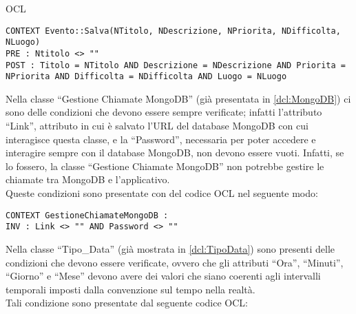 \begin{listaPersonale}{OCL}
    \begin{lstlisting}
CONTEXT Evento::Salva(NTitolo, NDescrizione, NPriorita, NDifficolta, NLuogo)
PRE : Ntitolo <> ""
POST : Titolo = NTitolo AND Descrizione = NDescrizione AND Priorita = NPriorita AND Difficolta = NDifficolta AND Luogo = NLuogo 
    \end{lstlisting}




    \begin{center}
        
    \end{center}
    Nella classe “Gestione Chiamate MongoDB” (già presentata in \ref{dcl:MongoDB}) ci sono delle condizioni che devono essere sempre verificate; infatti l'attributo “Link”, attributo in cui è salvato l'URL del database MongoDB con cui interagisce questa classe, e la “Password”, necessaria per poter accedere e interagire sempre con il database MongoDB, non devono essere vuoti. Infatti, se lo fossero, la classe “Gestione Chiamate MongoDB” non potrebbe gestire le chiamate tra MongoDB e l'applicativo.\\
    Queste condizioni sono presentate con del codice OCL nel seguente modo:

    \begin{lstlisting}
CONTEXT GestioneChiamateMongoDB :
INV : Link <> "" AND Password <> "" 
    \end{lstlisting}




    \begin{center}
        
    \end{center}
    Nella classe “Tipo\_Data” (già mostrata in \ref{dcl:TipoData}) sono presenti delle condizioni che devono essere verificate, ovvero che gli attributi “Ora”, “Minuti”, “Giorno” e “Mese” devono avere dei valori che siano coerenti agli intervalli temporali imposti dalla convenzione sul tempo nella realtà.\\
    Tali condizione sono presentate dal seguente codice OCL:


\end{listaPersonale}
